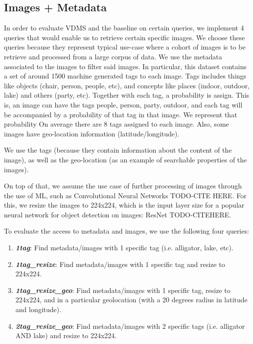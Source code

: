 \subsection{Images + Metadata}

In order to evaluate VDMS and the baseline on certain queries, we
implement 4 queries that would enable us to retrieve certain specific images.
We choose these queries because they represent typical use-case where a
cohort of images is to be retrieve and processed from a large corpus of data.
We use the metadata associated to the images to filter said images.
In particular, this dataset contains a set of around 1500 machine generated
tags to each image.
Tags includes things like objects (chair, person, people, etc), and
concepts like places (indoor, outdoor, lake) and others (party, etc).
Together with each tag, a probability is assign.
This is, an image can have the tags people, person, party, outdoor, and each
tag will be accompanied by a probability of that tag in that image.
We represent that probability
On average there are 8 tags assigned to each image.
Also, some images have geo-location information (latitude/longitude).

We use the tags (because they contain information about the content of
the image), as well as the geo-location (as an example of searchable properties
of the images).

On top of that, we assume the use case of further processing of images
through the use of ML, such as Convolutional Neural Networks TODO-CITE HERE.
For this, we resize the images to 224x224, which is the input layer size for
a popular neural network for object detection on images: ResNet TODO-CITEHERE.

To evaluate the access to metadata and images,
we use the following four queries:
\begin{enumerate}
\item {\bf {\em 1tag}}: Find metadata/images with 1 specific tag (i.e. alligator, lake, etc).
\item {\bf {\em 1tag\_resize}}: Find metadata/images with 1 specific tag and resize to 224x224.
\item {\bf {\em 1tag\_resize\_geo}}: Find metadata/images with 1 specific tag, resize to 224x224, and in a particular geolocation (with a 20 degrees radius in latitude and longitude).
\item {\bf {\em 2tag\_resize\_geo}}: Find metadata/images with 2 specific tags (i.e. alligator AND lake) and resize to 224x224.
\end{enumerate}

